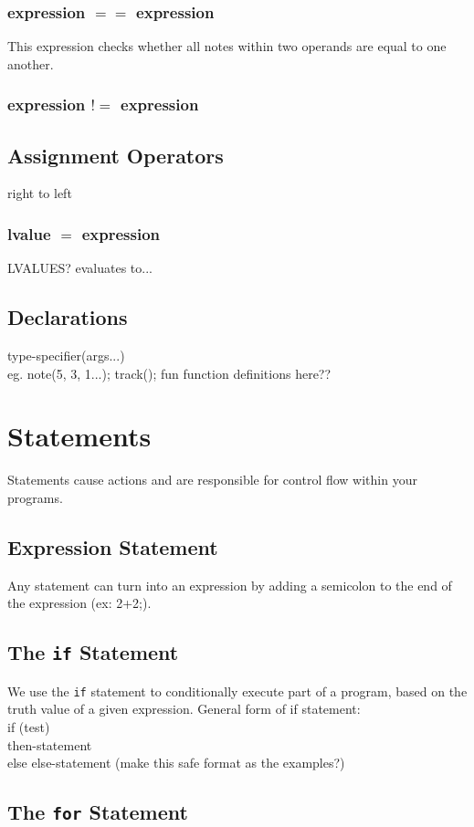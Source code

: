 \documentclass[letterpaper]{article}
\begin{document}
\subsubsection{expression $==$ expression}
This expression checks whether all notes within two operands are equal to one another. 
\subsubsection{expression $!=$ expression}

\subsection{Assignment Operators}
right to left
\subsubsection{lvalue $=$ expression}
LVALUES?
evaluates to...
\subsection{Declarations}
type-specifier(args...)\\
eg. note(5, 3, 1...); track(); fun
function definitions here??


\section{Statements}
Statements cause actions and are responsible for control flow within your programs.
\subsection{Expression Statement}
Any statement can turn into an expression by adding a semicolon to the end of the expression (ex: 2+2;). 
\subsection{The \texttt{if} Statement}
We use the \texttt{if} statement to conditionally execute part of a program, based on the truth value of a given expression.
General form of if statement: \\
if (test) \\
then-statement \\
else
else-statement (make this safe format as the examples?)
\subsection{The \texttt{for} Statement}
\end{document}
